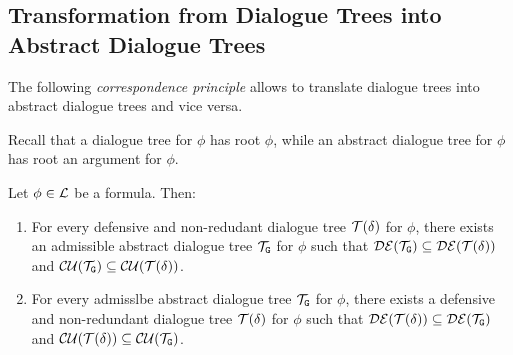 \subsection{Transformation from Dialogue Trees into Abstract Dialogue Trees}
\label{app:DT-AbstractDT}

The following \emph{correspondence principle} allows to
translate dialogue trees into abstract dialogue trees and vice versa.


\begin{remark}
Recall that a dialogue tree for $\phi$
has root $\phi$, while an abstract dialogue tree for $\phi$
has root an argument for $\phi$.
\end{remark}

\begin{theorem}  \label{thm:def-abs}
Let $\phi \in \mathcal{L}$ be a formula. Then:

\begin{enumerate}
    \item  For every defensive and non-redudant dialogue tree $\mathcal{T}(\delta)$ for $\phi$, there exists an admissible abstract dialogue tree $\mathcal{T}_{\texttt{\textup{G}}}$ for $\phi$ such that $\mathcal{DE}(\mathcal{T}_{\texttt{\textup{G}}}) \subseteq  \mathcal{DE}(\mathcal{T}(\delta))$ and $ \mathcal{CU}(\mathcal{T}_{\texttt{\textup{G}}})  \subseteq  \mathcal{CU}(\mathcal{T}(\delta))$.

    \item For every admisslbe abstract dialogue tree $\mathcal{T}_{\texttt{\textup{G}}}$ for $\phi$, there exists a defensive and non-redundant dialogue tree $\mathcal{T}(\delta)$ for $\phi$ such that $\mathcal{DE}(\mathcal{T}(\delta)) \subseteq \mathcal{DE}(\mathcal{T}_{\texttt{\textup{G}}})$ and $\mathcal{CU}(\mathcal{T}(\delta)) \subseteq \mathcal{CU}(\mathcal{T}_{\texttt{\textup{G}}})$.
\end{enumerate}
\end{theorem}

